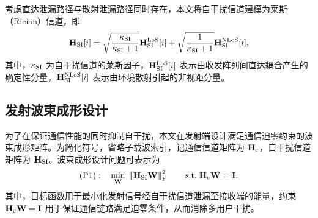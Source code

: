 \documentclass[onecolumn,10pt]{IEEEtran}
\begin{document}
考虑直达泄漏路径与散射泄漏路径同时存在，本文将自干扰信道建模为莱斯（Rician）信道，即
\begin{align}
    \mathbf{H}_{\rm SI}[i]
    =
    \sqrt{\frac{\kappa_{\rm SI}}{\kappa_{\rm SI}+1}}
    \mathbf{H}_{\rm SI}^{\rm LoS}[i]
    +
    \sqrt{\frac{1}{\kappa_{\rm SI}+1}}
    \mathbf{H}_{\rm SI}^{\rm NLoS}[i],
\end{align}
其中，$\kappa_{\rm SI}$ 为自干扰信道的莱斯因子，$\mathbf{H}_{\rm SI}^{\rm LoS}[i]$ 表示由收发阵列间直达耦合产生的确定性分量，$\mathbf{H}_{\rm SI}^{\rm NLoS}[i]$ 表示由环境散射引起的非视距分量。

\subsection{发射波束成形设计}

为了在保证通信性能的同时抑制自干扰，本文在发射端设计满足通信迫零约束的波束成形矩阵。为简化符号，省略子载波索引，记通信信道矩阵为 $\mathbf{H}_{\rm c}$，自干扰信道矩阵为 $\mathbf{H}_{\rm SI}$。波束成形设计问题可表示为
\begin{align}
    \mathrm{(P1):}\quad
    \min_{\mathbf{W}}
    \;
    \left\lVert \mathbf{H}_{\rm SI}\mathbf{W} \right\rVert_{\rm F}^2
    \qquad
    \mathrm{s.t.}\;
    \mathbf{H}_{\rm c}\mathbf{W} = \mathbf{I}.
\end{align}
其中，目标函数用于最小化发射信号经自干扰信道泄漏至接收端的能量，约束 $\mathbf{H}_{\rm c}\mathbf{W}=\mathbf{I}$ 用于保证通信链路满足迫零条件，从而消除多用户干扰。
\end{document}

